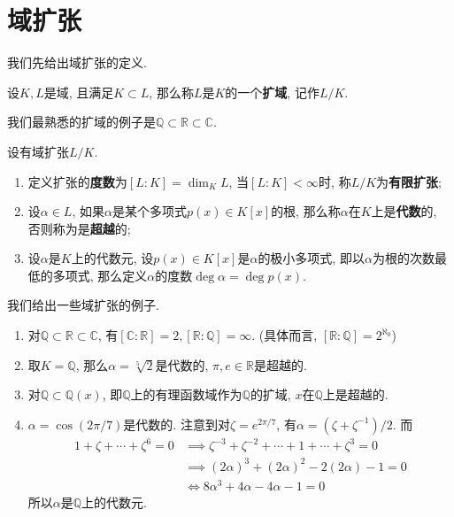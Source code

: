 \section{域扩张}

我们先给出域扩张的定义.
\begin{defn}
    设$K,L$是域, 且满足$K\subset L$, 那么称$L$是$K$的一个\textbf{扩域}, 记作$L/K$.
\end{defn}

\begin{eg}
    我们最熟悉的扩域的例子是$\mathbb{Q}\subset\mathbb{R}\subset\mathbb{C}$.
\end{eg}

\begin{defn}设有域扩张$L/K$.
    \begin{enumerate}
        \item 定义扩张的\textbf{度数}为$[L:K]=\dim_KL$, 当$[L:K]<\infty$时, 称$L/K$为\textbf{有限扩张};
        \item 设$\alpha\in L$, 如果$\alpha$是某个多项式$p(x)\in K[x]$的根, 那么称$\alpha$在$K$上是\textbf{代数}的, 否则称为是\textbf{超越}的;
        \item 设$\alpha$是$K$上的代数元, 设$p(x)\in K[x]$是$\alpha$的极小多项式, 即以$\alpha$为根的次数最低的多项式, 那么定义$\alpha$的度数$\deg\alpha=\deg p(x)$.
    \end{enumerate}
\end{defn}

\begin{eg}我们给出一些域扩张的例子.
    \begin{enumerate}
        \item 对$\mathbb{Q}\subset\mathbb{R}\subset\mathbb{C}$, 有$[\mathbb{C}:\mathbb{R}]=2,[\mathbb{R}:\mathbb{Q}]=\infty$.
        (具体而言, $[\mathbb{R}:\mathbb{Q}]=2^{\aleph_0}$)
        \item 取$K=\mathbb{Q}$, 那么$\alpha=\sqrt[5]{2}$是代数的, $\pi, e\in\mathbb{R}$是超越的.
        \item 对$\mathbb{Q}\subset\mathbb{Q}(x)$, 即$\mathbb{Q}$上的有理函数域作为$\mathbb{Q}$的扩域, $x$在$\mathbb{Q}$上是超越的.
        \item $\alpha=\cos(2\pi/7)$是代数的.
        注意到对$\zeta=e^{2\pi/7}$, 有$\alpha=(\zeta+\zeta^{-1})/2$.
        而
        \begin{align*}
            1+\zeta+\cdots+\zeta^6=0&\implies \zeta^{-3}+\zeta^{-2}+\cdots+1+\cdots+\zeta^3=0\\
            &\implies (2\alpha)^3+(2\alpha)^2-2(2\alpha)-1=0\\
            &\iff 8\alpha^3+4\alpha-4\alpha-1=0
        \end{align*}
        所以$\alpha$是$\mathbb{Q}$上的代数元.
    \end{enumerate}
\end{eg}

